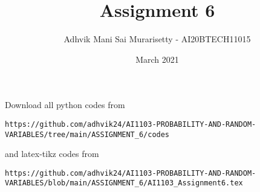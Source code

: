\documentclass[journal,12pt,twocolumn]{IEEEtran}
\date{March 2021}
\DeclareMathOperator*{\Res}{Res}
\begin{document}
\newcommand{\BEQA}{\begin{eqnarray}}
\newcommand{\EEQA}{\end{eqnarray}}
\newcommand{\define}{\stackrel{\triangle}{=}}

\raggedbottom
\setlength{\parindent}{0pt}
\providecommand{\mbf}{\mathbf}
\providecommand{\pr}[1]{\ensuremath{\Pr\left(#1\right)}}
\providecommand{\qfunc}[1]{\ensuremath{Q\left(#1\right)}}
\providecommand{\fn}[1]{\ensuremath{f\left(#1\right)}}
\providecommand{\e}[1]{\ensuremath{E\left(#1\right)}}
\providecommand{\sbrak}[1]{\ensuremath{{}\left[#1\right]}}
\providecommand{\lsbrak}[1]{\ensuremath{{}\left[#1\right.}}
\providecommand{\rsbrak}[1]{\ensuremath{{}\left.#1\right]}}
\providecommand{\brak}[1]{\ensuremath{\left(#1\right)}}
\providecommand{\lbrak}[1]{\ensuremath{\left(#1\right.}}
\providecommand{\rbrak}[1]{\ensuremath{\left.#1\right)}}
\providecommand{\cbrak}[1]{\ensuremath{\left\{#1\right\}}}
\providecommand{\lcbrak}[1]{\ensuremath{\left\{#1\right.}}
\providecommand{\rcbrak}[1]{\ensuremath{\left.#1\right\}}}
\theoremstyle{remark}
\newtheorem{rem}{Remark}
\newcommand{\sgn}{\mathop{\mathrm{sgn}}}
\newcommand{\comb}[2]{{}^{#1}\mathrm{C}_{#2}}
\providecommand{\abs}[1]{\vert#1\vert}
\providecommand{\res}[1]{\Res\displaylimits_{#1}} 
\providecommand{\norm}[1]{\lVert#1\rVert}
\providecommand{\mtx}[1]{\mathbf{#1}}
\providecommand{\mean}[1]{E[ #1 ]}
\providecommand{\fourier}{\overset{\mathcal{F}}{ \rightleftharpoons}}
\providecommand{\system}{\overset{\mathcal{H}}{ \longleftrightarrow}}
\newcommand{\solution}{\noindent \textbf{Solution: }}
\newcommand{\cosec}{\,\text{cosec}\,}
\providecommand{\dec}[2]{\ensuremath{\overset{#1}{\underset{#2}{\gtrless}}}}
\newcommand{\myvec}[1]{\ensuremath{\begin{pmatrix}#1\end{pmatrix}}}
\newcommand{\mydet}[1]{\ensuremath{\begin{vmatrix}#1\end{vmatrix}}}
\makeatletter
\vspace{3cm}
\title{Assignment 6}
\author{Adhvik Mani Sai Murarisetty - AI20BTECH11015}
\maketitle
\newpage
\bigskip
\renewcommand{\thetable}{\theenumi}
Download all python codes from 
\begin{lstlisting}
https://github.com/adhvik24/AI1103-PROBABILITY-AND-RANDOM-VARIABLES/tree/main/ASSIGNMENT_6/codes
\end{lstlisting}
%
and latex-tikz codes from 
%
\begin{lstlisting}
https://github.com/adhvik24/AI1103-PROBABILITY-AND-RANDOM-VARIABLES/blob/main/ASSIGNMENT_6/AI1103_Assignment6.tex
\end{lstlisting}
\end{document}
